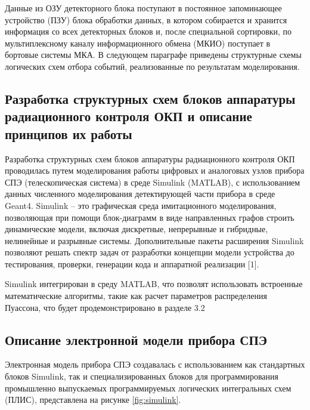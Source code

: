 Данные из ОЗУ детекторного блока поступают в постоянное запоминающее устройство (ПЗУ) блока обработки данных, в котором собирается и хранится информация со всех детекторных блоков и, после специальной сортировки, по мультиплексному каналу информационного обмена (МКИО) поступает в бортовые системы МКА. В следующем параграфе приведены структурные схемы логических схем отбора событий, реализованные по результатам моделирования. 

\subsection{Разработка структурных схем блоков аппаратуры радиационного контроля ОКП и описание принципов их работы}

Разработка структурных схем блоков аппаратуры радиационного контроля ОКП проводилась путем моделирования работы цифровых и аналоговых узлов прибора СПЭ (телескопическая система) в среде Simulink (MATLAB), с использованием данных численного моделирования детектирующей части прибора в среде Geant4. 
Simulink – это графическая среда имитационного моделирования, позволяющая при помощи блок-диаграмм в виде направленных графов строить динамические модели, включая дискретные, непрерывные и гибридные, нелинейные и разрывные системы. Дополнительные пакеты расширения Simulink позволяют решать спектр задач от разработки концепции модели устройства до тестирования, проверки, генерации кода и аппаратной реализации [1].

Simulink интегрирован в среду MATLAB, что позволят использовать встроенные математические алгоритмы, такие как расчет параметров распределения Пуассона, что будет продемонстрировано в разделе 3.2

\subsection{ Описание электронной модели прибора СПЭ}

Электронная модель прибора СПЭ создавалась с использованием как стандартных блоков Simulink, так и специализированных блоков для программирования промышленно выпускаемых программируемых логических интегральных схем (ПЛИС), представлена на рисунке \ref{fig:simulink}.


